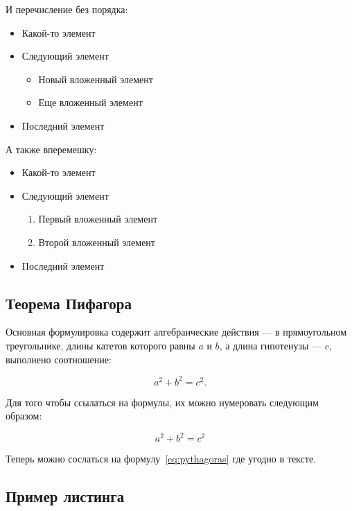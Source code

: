 И перечисление без порядка:

\begin{itemize}
\tightlist
\item
  Какой-то элемент
\item
  Следующий элемент

  \begin{itemize}
  \tightlist
  \item
    Новый вложенный элемент
  \item
    Еще вложенный элемент
  \end{itemize}
\item
  Последний элемент
\end{itemize}

А также вперемешку:

\begin{itemize}
\tightlist
\item
  Какой-то элемент
\item
  Следующий элемент

  \begin{enumerate}
  \def\labelenumi{\arabic{enumi}.}
  \tightlist
  \item
    Первый вложенный элемент
  \item
    Второй вложенный элемент
  \end{enumerate}
\item
  Последний элемент
\end{itemize}

\subsection{Теорема Пифагора}\label{sec:pythagoras}

Основная формулировка содержит алгебраические действия --- в
прямоугольном треугольнике, длины катетов которого равны \(a\) и \(b\),
а длина гипотенузы --- \(c\), выполнено соотношение:

\[
a^2 + b^2 = c^2.
\]

Для того чтобы ссылаться на формулы, их можно нумеровать следующим
образом:

\begin{equation}\label{eq:pythagoras}{
a^2 + b^2 = c^2
}\end{equation}

Теперь можно сослаться на формулу~\ref{eq:pythagoras} где угодно в
тексте.

\subsection{Пример листинга}\label{sec:lst-example}

